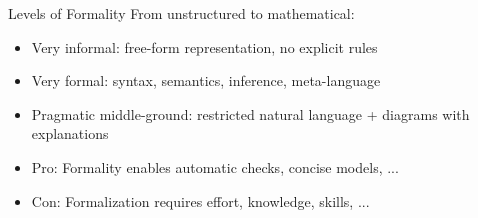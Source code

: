 \begin{Slide}{Levels of Formality}
From unstructured to mathematical:
\begin{itemize}
\item Very informal: free-form representation, no explicit rules
\item Very formal: syntax, semantics, inference, meta-language
\item Pragmatic middle-ground: restricted natural language + diagrams with explanations
\item Pro: Formality enables automatic checks, concise models, ...
\item Con: Formalization requires effort, knowledge, skills, ...

\end{itemize}
\end{Slide}